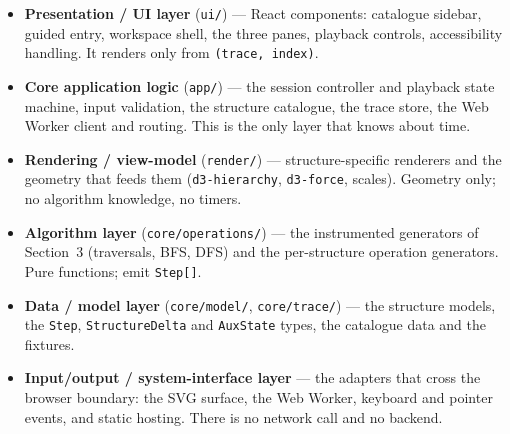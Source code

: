 \documentclass[11pt,a4paper]{article}
\newcommand{\ct}[1]{\texttt{#1}}
\begin{document}
\begin{itemize}[leftmargin=1.4em,topsep=2pt,itemsep=2pt]
  \item \textbf{Presentation / UI layer} (\ct{ui/}) --- React components: catalogue sidebar, guided
        entry, workspace shell, the three panes, playback controls, accessibility handling. It
        renders only from \ct{(trace, index)}.
  \item \textbf{Core application logic} (\ct{app/}) --- the session controller and playback state
        machine, input validation, the structure catalogue, the trace store, the Web Worker client
        and routing. This is the only layer that knows about time.
  \item \textbf{Rendering / view-model} (\ct{render/}) --- structure-specific renderers and the
        geometry that feeds them (\ct{d3-hierarchy}, \ct{d3-force}, scales). Geometry only; no
        algorithm knowledge, no timers.
  \item \textbf{Algorithm layer} (\ct{core/operations/}) --- the instrumented generators of
        Section~3 (traversals, BFS, DFS) and the per-structure operation generators. Pure
        functions; emit \ct{Step[]}.
  \item \textbf{Data / model layer} (\ct{core/model/}, \ct{core/trace/}) --- the structure models,
        the \ct{Step}, \ct{StructureDelta} and \ct{AuxState} types, the catalogue data and the
        fixtures.
  \item \textbf{Input/output / system-interface layer} --- the adapters that cross the browser
        boundary: the SVG surface, the Web Worker, keyboard and pointer events, and static
        hosting. There is no network call and no backend.
\end{itemize}
\end{document}
